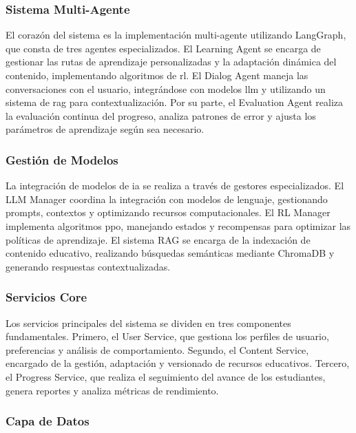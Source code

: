 \subsubsection{Sistema Multi-Agente}
\label{sistema-multi-agente}

El corazón del sistema es la implementación multi-agente utilizando LangGraph, que consta de tres agentes especializados. El Learning Agent se encarga de gestionar las rutas de aprendizaje personalizadas y la adaptación dinámica del contenido, implementando algoritmos de \gls{rl}. El Dialog Agent maneja las conversaciones con el usuario, integrándose con modelos \gls{llm} y utilizando un sistema de \gls{rag} para contextualización. Por su parte, el Evaluation Agent realiza la evaluación continua del progreso, analiza patrones de error y ajusta los parámetros de aprendizaje según sea necesario.

\subsubsection{Gestión de Modelos}
\label{gestion-modelos}

La integración de modelos de \gls{ia} se realiza a través de gestores especializados. El LLM Manager coordina la integración con modelos de lenguaje, gestionando prompts, contextos y optimizando recursos computacionales. El RL Manager implementa algoritmos \gls{ppo}, manejando estados y recompensas para optimizar las políticas de aprendizaje. El sistema RAG se encarga de la indexación de contenido educativo, realizando búsquedas semánticas mediante ChromaDB y generando respuestas contextualizadas.

\subsubsection{Servicios Core}
\label{servicios-core}

Los servicios principales del sistema se dividen en tres componentes fundamentales. Primero, el User Service, que gestiona los perfiles de usuario, preferencias y análisis de comportamiento. Segundo, el Content Service, encargado de la gestión, adaptación y versionado de recursos educativos. Tercero, el Progress Service, que realiza el seguimiento del avance de los estudiantes, genera reportes y analiza métricas de rendimiento.

\subsubsection{Capa de Datos}
\label{capa-datos}

